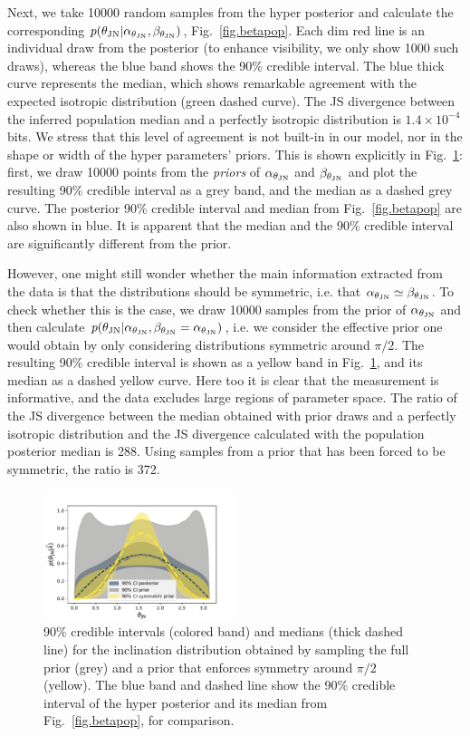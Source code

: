 \documentclass[floats,floatfix,showpacs,amssymb,prl,twocolumn,superscriptaddress,nofootinbib]{revtex4-2}
\newcommand{\tjn}{\ensuremath{\theta_{\rm{JN}}}\xspace}
\newcommand{\atjn}{\ensuremath{\alpha_{\tjn}}\xspace}
\newcommand{\btjn}{\ensuremath{\beta_{\tjn}}\xspace}
\begin{document}
Next, we take 10000 random samples from the hyper posterior and calculate the corresponding $p(\tjn | \alpha_{\tjn}, \beta_{\tjn})$, Fig.~\ref{fig.betapop}. Each dim red line is an individual draw from the posterior (to enhance visibility, we only show 1000 such draws), whereas the blue band shows the 90\% credible interval. The blue thick curve represents the median, which shows remarkable agreement with the expected isotropic distribution (green dashed curve). The JS divergence between the inferred population median and a perfectly isotropic distribution is $1.4\times 10^{-4}$ bits.
We stress that this level of agreement is not built-in in our model, nor in the shape or width of the hyper parameters' priors. 
This is shown explicitly in Fig.~\ref{fig.betaprio}: first, we draw 10000 points from the \emph{priors} of \atjn and \btjn and plot the resulting 90\% credible interval as a grey band, and the median as a dashed grey curve. The posterior 90\% credible interval and median from Fig.~\ref{fig.betapop} are also shown in blue. It is apparent that the median and the 90\% credible interval are significantly different from the prior. 

However, one might still wonder whether the main information extracted from the data is that the distributions should be symmetric, i.e. that $\atjn \simeq \btjn$. To check whether this is the case, we draw 10000 samples from the prior of $\atjn$ and then calculate $p(\tjn | \alpha_{\tjn}, \beta_{\tjn}=\atjn)$, i.e. we consider the effective prior one would obtain by only considering distributions symmetric around $\pi/2$. The resulting 90\% credible interval is shown as a yellow band in Fig.~\ref{fig.betaprio}, and its median as a dashed yellow curve. Here too it is clear that the measurement is informative, and the data excludes large regions of parameter space. 
The ratio of the JS divergence between the median obtained with prior draws and a perfectly isotropic distribution and the JS divergence calculated with the population posterior median is 288. Using samples from a prior that has been forced to be symmetric, the ratio is 372. 

\begin{figure}[t]
\includegraphics[width=0.5\textwidth]{Figs/BetaPriorsIFAR1yr}
\caption{90\% credible intervals (colored band) and medians (thick dashed line) for the inclination distribution obtained by sampling the full prior (grey) and a prior that enforces symmetry around $\pi/2$ (yellow). The blue band and dashed line show the 90\% credible interval of the hyper posterior and its median from Fig.~\ref{fig.betapop}, for comparison.}\label{fig.betaprio}
\end{figure}
\end{document}
